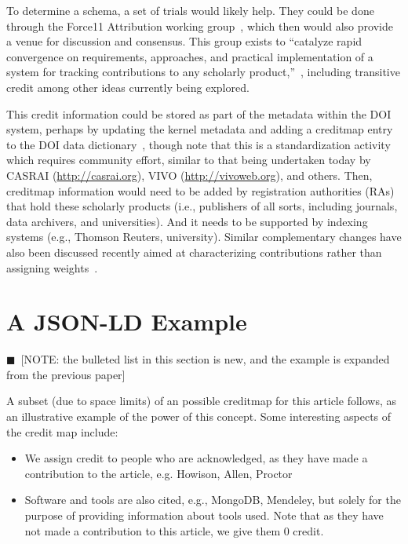 \documentclass[a4paper,10pt]{article}
\newcommand{\note}[1]{{\color{darkgreen}$\blacksquare$~\textsf{[NOTE: #1]}}}
\begin{document}
To determine a schema, a set of trials would likely help.  They could be done through the Force11 Attribution working group~\cite{force11AWG}, which then would also provide a venue for discussion and consensus.  This group exists to ``catalyze rapid convergence on requirements, approaches, and practical implementation of a system for tracking contributions to any scholarly product,''~\cite{force11AWG}, including transitive credit among other ideas currently being explored.

This credit information could be stored as part of the metadata within the DOI system, perhaps by updating the kernel metadata and adding a creditmap entry to the DOI data dictionary~\cite{DOI-data-model}, though note that this is a standardization activity which requires community effort, similar to that being undertaken today by CASRAI (\url{http://casrai.org}), VIVO (\url{http://vivoweb.org}), and others. Then, creditmap information would need to be added by registration authorities (RAs) that hold these scholarly products (i.e., publishers of all sorts, including journals, data archivers, and universities).  And it needs to be supported by indexing systems (e.g., Thomson Reuters, university). Similar complementary changes have also been discussed recently aimed at characterizing contributions rather than assigning  weights~\cite{metatags,contributorship-taxonomy,teams}.


\section{A JSON-LD Example}

\note{the bulleted list in this section is new, and the example is expanded from the previous paper}

A subset (due to space limits) of an possible creditmap for this article follows, as an illustrative example of the power of this concept. Some interesting aspects of the credit map include:
\begin{itemize}
\item We assign credit to people who are acknowledged, as they have made a contribution to the article, e.g. Howison, Allen, Proctor
\item Software and tools are also cited, e.g., MongoDB, Mendeley, but solely for the purpose of providing information about tools used. Note that as they have not made a contribution to this article, we give them 0 credit.
\end{itemize}
\end{document}
